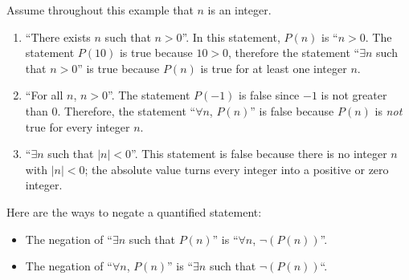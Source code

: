 \begin{example} Assume throughout this example that $n$ is an integer.
	\begin{enumerate}[label=\alph*)]
		\item ``There exists $n$ such that $n > 0$''. In this statement, $P (n)$ is ``$n > 0$. The statement $P (10)$ is true because $10 > 0$, therefore the statement ``$\exists n$ such that $n > 0$'' is true because $P (n)$ is true for at least one integer $n$.
		\item ``For all $n$, $n > 0$''. The statement $P (-1)$ is false since $-1$ is not greater than $0$. Therefore, the statement ``$\forall n$, $P (n)$'' is false because $P(n)$ is \textit{not} true for every integer $n$.
		\item ``$\exists n$ such that $|n| < 0$''. This statement is false because there is no integer $n$ with $|n| < 0$; the absolute value turns every integer into a positive or zero integer.
	\end{enumerate}
\end{example}

Here are the ways to negate a quantified statement:
\begin{itemize}
	\item The negation of ``$\exists n$ such that $P (n)$'' is ``$\forall n$, $\neg (P (n))$''.
	\item The negation of ``$\forall n$, $P(n)$'' is ``$\exists n$ such that $\neg (P (n))$``.
\end{itemize}





